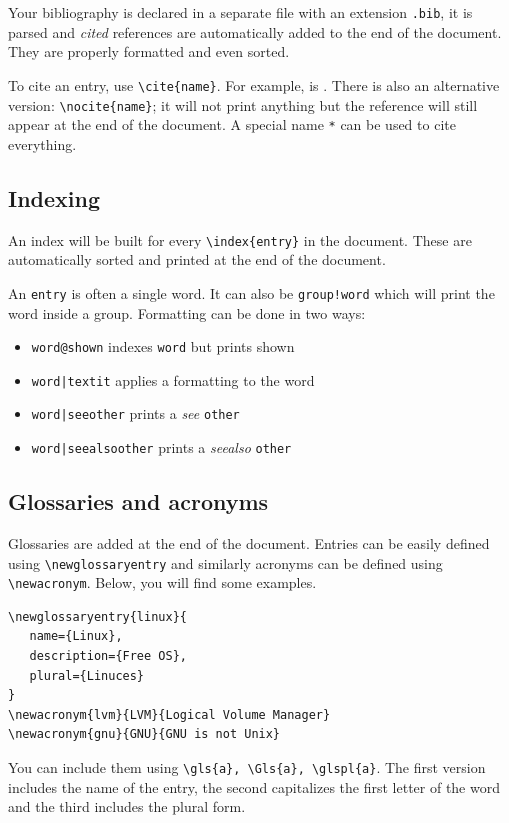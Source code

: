 Your bibliography is declared in a separate file with an extension
\texttt{.bib}, it is parsed and \emph{cited} references are automatically added
to the end of the document.
They are properly formatted and even sorted.

To cite an entry, use \lstinline!\cite{name}!.
For example,  is
\cite{latex-comprehensive-symbol}.
There is also an alternative version: \lstinline!\nocite{name}!;
it will not print anything but the reference will still appear at the end of the
document.
A special name \texttt{*} can be used to cite everything.

\subsection{Indexing}

An index will be built for every \lstinline!\index{entry}! in the document.
These are automatically sorted and printed at the end of the document.

An \texttt{entry} is often a single word.
It can also be \texttt{group!word} which will print the word inside a group.
Formatting can be done in two ways:
\begin{itemize}
\item \texttt{word@shown} indexes \texttt{word} but prints {shown}
\item \texttt{word|textit} applies a formatting to the word
\item \texttt{word|see{other}} prints a \emph{see} \texttt{other}
\item \texttt{word|seealso{other}} prints a \emph{seealso} \texttt{other}
\end{itemize}

\subsection{Glossaries and acronyms}

Glossaries are added at the end of the document.
Entries can be easily defined using \lstinline!\newglossaryentry! and similarly
acronyms can be defined using \lstinline!\newacronym!.
Below, you will find some examples.

\begin{lstlisting}
\newglossaryentry{linux}{
   name={Linux},
   description={Free OS},
   plural={Linuces}
}
\newacronym{lvm}{LVM}{Logical Volume Manager}
\newacronym{gnu}{GNU}{GNU is not Unix}
\end{lstlisting}

You can include them using \lstinline!\gls{a}, \Gls{a}, \glspl{a}!.
The first version includes the name of the entry, the second capitalizes the
first letter of the word and the third includes the plural form.
